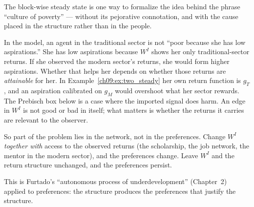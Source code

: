 \documentclass[../structural_economics_book.tex]{subfiles}
\begin{document}
\begin{intuition}
The block-wise steady state is one way to formalize the idea behind the phrase ``culture of poverty'' --- without its pejorative connotation, and with the cause placed in the structure rather than in the people.

In the model, an agent in the traditional sector is not ``poor because she has low aspirations.'' She has low aspirations because $W^I$ shows her only traditional-sector returns. If she observed the modern sector's returns, she would form higher aspirations. Whether that helps her depends on whether those returns are \textit{attainable} for her. In Example~\ref{ch09:ex:two_steady} her own return function is $g_T$, and an aspiration calibrated on $g_M$ would overshoot what her sector rewards. The Prebisch box below is a case where the imported signal does harm. An edge in $W^I$ is not good or bad in itself; what matters is whether the returns it carries are relevant to the observer.

So part of the problem lies in the network, not in the preferences. Change $W^I$ \textit{together with} access to the observed returns (the scholarship, the job network, the mentor in the modern sector), and the preferences change. Leave $W^I$ and the return structure unchanged, and the preferences persist.

This is Furtado's ``autonomous process of underdevelopment'' (Chapter~2) applied to preferences: the structure produces the preferences that justify the structure.
\end{intuition}
\end{document}
